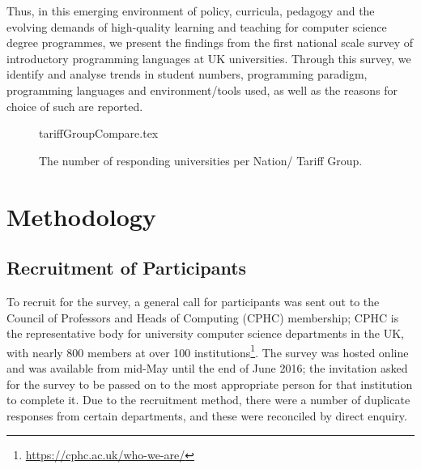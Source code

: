\documentclass{sig-alternate}
\begin{document}
Thus, in this emerging environment of policy, curricula, pedagogy and
the evolving demands of high-quality learning and teaching for computer
science degree programmes, we present the findings from the first
national scale survey of introductory programming languages at UK
universities. Through this survey, we identify and analyse trends in
student numbers, programming paradigm, programming languages and
environment/tools used, as well as the reasons for choice of such are
reported.


\begin{figure}
\begin{center}
{tariffGroupCompare.tex}\vskip-12pt
\caption{The number of responding universities per Nation/   
 Tariff Group.\label{fig:TG}}
\end{center}
\end{figure}



\section{Methodology}\label{method}

\subsection{Recruitment of Participants}

To recruit for the survey, a general call for participants was sent
out to the Council of Professors and Heads of Computing (CPHC)
membership; CPHC is the representative body for university computer
science departments in the UK, with nearly 800 members at over 100
institutions\footnote{\url{https://cphc.ac.uk/who-we-are/}}. The
survey was hosted online and was available from mid-May until the end
of June 2016; the invitation asked for the survey to be passed on to
the most appropriate person for that institution to complete it. Due
to the recruitment method, there were a number of duplicate responses
from certain departments, and these were reconciled by direct enquiry.
\end{document}
